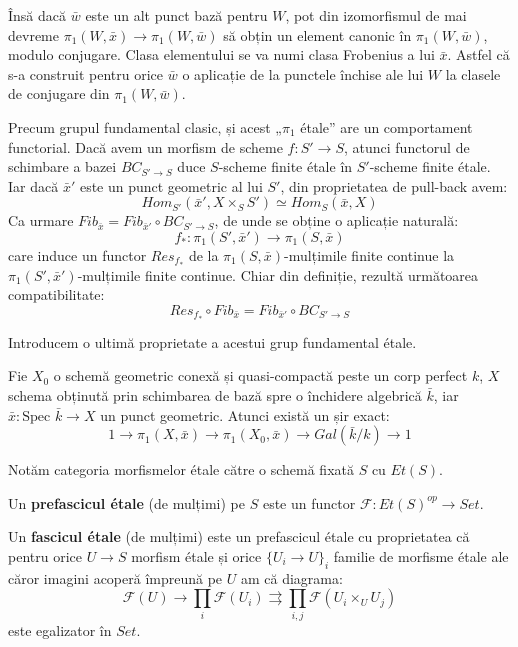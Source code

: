 \documentclass[13pt,openany]{book}
\begin{document}
Însă dacă $\bar{w}$ este un alt punct bază pentru $W$, pot din izomorfismul de mai devreme $ \pi_1(W,\bar{x}) \rightarrow \pi_1(W,\bar{w})$ să obțin un element canonic în $\pi_1(W,\bar{w})$, modulo conjugare. Clasa elementului se va numi clasa Frobenius a lui $\bar{x}$. Astfel că s-a construit pentru orice $\bar{w}$ o aplicație de la punctele închise ale lui $W$ la clasele de conjugare din $\pi_1(W,\bar{w})$.

Precum grupul fundamental clasic, și acest „$\pi_1$ étale” are un comportament functorial. Dacă avem un morfism de scheme $f: S' \rightarrow S$, atunci functorul de schimbare a bazei $BC_{S'\rightarrow S}$ duce $S$-scheme finite étale în $S'$-scheme finite étale. Iar dacă $\bar{x}'$ este un punct geometric al lui $S'$, din proprietatea de pull-back avem:
$$Hom_{S'}(\bar{x}',X \times_S S')\simeq Hom_S(\bar{x},X)$$
Ca urmare $Fib_{\bar{x}} = Fib_{\bar{x}'} \circ BC_{S'\rightarrow S}$, de unde se obține o aplicație naturală:
$$f_* : \pi_1(S',\bar{x}') \rightarrow \pi_1(S,\bar{x})$$
care induce un functor $Res_{f_*}$ de la $\pi_1(S,\bar{x})$-mulțimile finite continue la $\pi_1(S',\bar{x}')$-mulțimile finite continue. Chiar din definiție, rezultă următoarea compatibilitate:
$$Res_{f_*} \circ Fib_{\bar{x}} = Fib_{\bar{x}'} \circ BC_{S'\rightarrow S}$$

Introducem o ultimă proprietate a acestui grup fundamental étale.

\begin{teo}
Fie $X_0$ o schemă geometric conexă și quasi-compactă peste un corp perfect $k$, $X$ schema obținută prin schimbarea de bază spre o închidere algebrică $\bar{k}$, iar $\bar{x} : \text{Spec }\bar{k} \rightarrow X$ un punct geometric. Atunci există un șir exact:
$$1 \rightarrow \pi_1(X,\bar{x}) \rightarrow \pi_1(X_0,\bar{x}) \rightarrow Gal(\bar{k}/k) \rightarrow 1$$
\end{teo}

Notăm categoria morfismelor étale către o schemă fixată $S$ cu $Et(S)$.

\begin{defi}
Un {\bf prefascicul étale} (de mulțimi) pe $S$ este un functor $\mathcal{F} : Et(S)^{op} \rightarrow Set$.
\end{defi}

\begin{defi}
Un {\bf fascicul étale} (de mulțimi) este un prefascicul étale cu proprietatea că pentru orice $U \rightarrow S$ morfism étale și orice $\{U_i \rightarrow U\}_i$ familie de morfisme étale ale căror imagini acoperă împreună pe $U$ am că diagrama:
$$\mathcal{F}(U) \rightarrow \prod_i \mathcal{F}(U_i) \rightrightarrows \prod_{i,j} \mathcal{F}(U_i \times_U U_j)$$
este egalizator în $Set$.
\end{defi}
\end{document}
